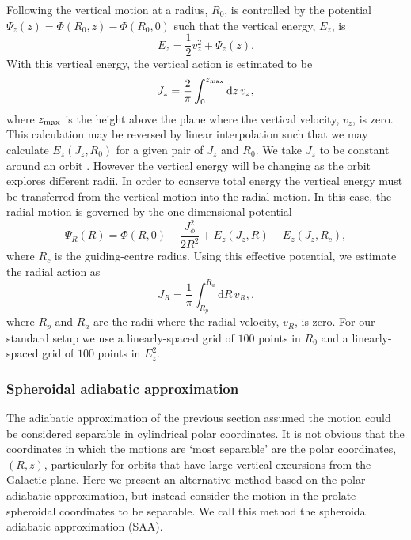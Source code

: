 \documentclass[useAMS,usenatbib,fleqn,a4paper]{mn2e}
\def\half{{\textstyle{\frac12}}}
\begin{document}
Following \citet{Schonrich2012} the vertical motion at a radius, $R_0$, is controlled by the potential $\Psi_z(z) = \Phi(R_0, z)-\Phi(R_0,0)$ such that the vertical energy, $E_z$, is
\begin{equation}
E_z=\half v_z^2+\Psi_z(z).
\end{equation}
With this vertical energy, the vertical action is estimated to be
\begin{equation}
J_z = \frac{2}{\pi}\int_{0}^{z_{\rm max}}\mathrm{d}z\,v_z,
\end{equation}
where $z_{\rm max}$ is the height above the plane where the vertical velocity, $v_z$, is zero.
This calculation may be reversed by linear interpolation such that we may calculate $E_z(J_z,R_0)$ for a given pair of $J_z$ and $R_0$. We take $J_z$ to be constant around an orbit . However the vertical energy will be changing as the orbit explores different radii. In order to conserve total energy the vertical energy must be transferred from the vertical motion into the radial motion. In this case, the radial motion is governed by the one-dimensional potential
\begin{equation}
\Psi_R(R) =  \Phi(R,0) + \frac{J_\phi^2}{2R^2}+E_z(J_z,R)-E_z(J_z,R_c),
\end{equation}
where $R_c$ is the guiding-centre radius.
Using this effective potential, we estimate the radial action as
\begin{equation}
J_R = \frac{1}{\pi}\int_{R_p}^{R_a}\mathrm{d}R\,v_R,.
\end{equation}
where $R_p$ and $R_a$ are the radii where the radial velocity, $v_R$, is zero. For our standard setup we use a linearly-spaced grid of $100$ points in $R_0$ and a linearly-spaced grid of $100$ points in $E_z^2$.

\subsubsection{Spheroidal adiabatic approximation}\label{Method::SAA}
The adiabatic approximation of the previous section assumed the motion could be considered separable in cylindrical polar coordinates. It is not obvious that the coordinates in which the motions are `most separable' are the polar coordinates, $(R,z)$, particularly for orbits that have large vertical excursions from the Galactic plane. Here we present an alternative method based on the polar adiabatic approximation, but instead consider the motion in the prolate spheroidal coordinates to be separable. We call this method the spheroidal adiabatic approximation (SAA).
\end{document}
